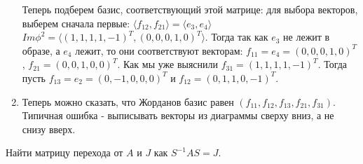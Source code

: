 \begin{example}
\begin{enumerate}
        Теперь подберем базис, соответствующий этой матрице: для выбора векторов, выберем сначала первые:
        $\langle f_{12}, f_{21}\rangle = \langle e_3, e_4\rangle$
        $Im \phi^2 = \langle (1, 1, 1, 1, -1)^T, (0, 0, 0, 1, 0)^T \rangle$. 
        Тогда так как $e_3$ не лежит в образе, а $e_4$ лежит, то они соответствуют векторам: $f_{11} = e_4 = (0, 0, 0, 1, 0)^T$, $f_{21} = (0, 0, 1, 0, 0)^T$. Как мы уже выяснили $f_{31} = (1, 1, 1, 1, -1)^T$. Тогда пусть $f_{13} = e_2 = (0, -1, 0, 0, 0)^T$ и $f_{12} = (0, 1, 1, 0, -1)^T$.
        \item Теперь можно сказать, что Жорданов базис равен $(f_{11}, f_{12}, f_{13}, f_{21}, f_{31})$. 
        Типичная ошибка - выписывать векторы из диаграммы сверху вниз, а не снизу вверх.
    \end{enumerate}
\end{example}

\begin{exercise}
    Найти матрицу перехода от $A$ и $J$ как $S^{-1}AS = J$.
\end{exercise}